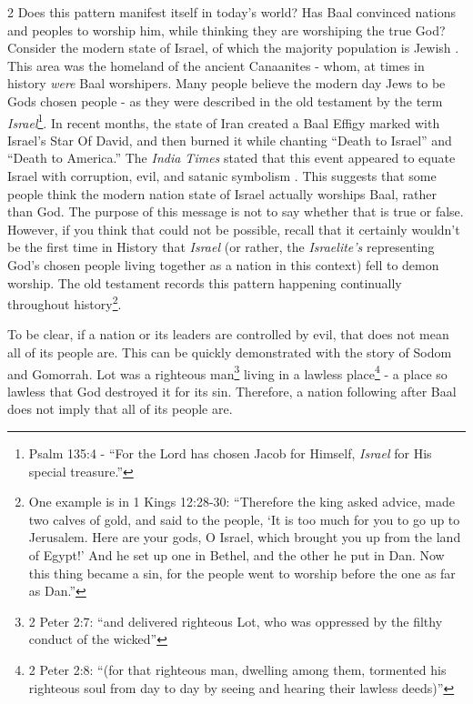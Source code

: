 \documentclass[10pt]{article}
\begin{document}
\begin{multicols}{2}
Does this pattern manifest itself in today's world? Has Baal convinced nations and peoples to worship him, while thinking they are worshiping the true God? Consider the modern state of Israel, of which the majority population is Jewish \cite{jewish pop}. This area was the homeland of the ancient Canaanites - whom, at times in history \textit{were} Baal worshipers. Many people believe the modern day Jews to be Gods chosen people - as they were described in the old testament by the term \textit{Israel}\footnote{Psalm 135:4 - ``For the Lord has chosen Jacob for Himself, \textit{Israel} for His special treasure.''}. In recent months, the state of Iran created a Baal Effigy marked with Israel's Star Of David, and then burned it while chanting ``Death to Israel'' and ``Death to America.'' The \textit{India Times} stated that this event appeared to equate Israel with corruption, evil, and satanic symbolism \cite{indiaTimes}. This suggests that some people think the modern nation state of Israel actually worships Baal, rather than God. The purpose of this message is not to say whether that is true or false. However, if you think that could not be possible, recall that it certainly wouldn't be the first time in History that \textit{Israel} (or rather, the \textit{Israelite's} representing God's chosen people living together as a nation in this context) fell to demon worship. The old testament records this pattern happening continually throughout history\footnote{One example is in 1 Kings 12:28-30: ``Therefore the king asked advice, made two calves of gold, and said to the people, `It is too much for you to go up to Jerusalem. Here are your gods, O Israel, which brought you up from the land of Egypt!' And he set up one in Bethel, and the other he put in Dan. Now this thing became a sin, for the people went to worship before the one as far as Dan.''}.

To be clear, if a nation or its leaders are controlled by evil, that does not mean all of its people are. This can be quickly demonstrated with the story of Sodom and Gomorrah. Lot was a righteous man\footnote{2 Peter 2:7: ``and delivered righteous Lot, who was oppressed by the filthy conduct of the wicked''} living in a lawless place\footnote{2 Peter 2:8: ``(for that righteous man, dwelling among them, tormented his righteous soul from day to day by seeing and hearing their lawless deeds)''} - a place so lawless that God destroyed it for its sin. Therefore, a nation following after Baal does not imply that all of its people are.


\end{multicols}
\end{document}
